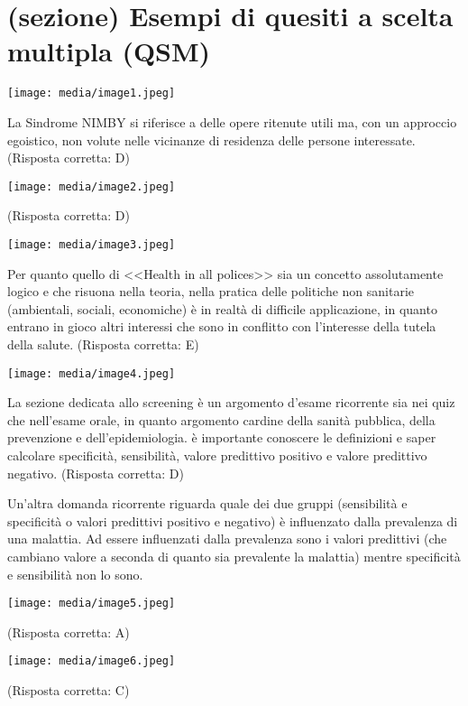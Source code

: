 \documentclass[]{article}
\date{}
\begin{document}
\section{(sezione) Esempi di quesiti a scelta multipla
(QSM)}\label{sezione-esempi-di-quesiti-a-scelta-multipla-qsm}

\texttt{[image: media/image1.jpeg]}

La Sindrome NIMBY si riferisce a delle opere ritenute utili ma, con un
approccio egoistico, non volute nelle vicinanze di residenza delle
persone interessate. (Risposta corretta: D)

\texttt{[image: media/image2.jpeg]}

(Risposta corretta: D)

\texttt{[image: media/image3.jpeg]}

Per quanto quello di \textless{}\textless{}Health in all
polices\textgreater{}\textgreater{} sia un concetto assolutamente logico
e che risuona nella teoria, nella pratica delle politiche non sanitarie
(ambientali, sociali, economiche) è in realtà di difficile applicazione,
in quanto entrano in gioco altri interessi che sono in conflitto con
l'interesse della tutela della salute. (Risposta corretta: E)

\texttt{[image: media/image4.jpeg]}

La sezione dedicata allo screening è un argomento d'esame ricorrente sia
nei quiz che nell'esame orale, in quanto argomento cardine della sanità
pubblica, della prevenzione e dell'epidemiologia. è importante conoscere
le definizioni e saper calcolare specificità, sensibilità, valore
predittivo positivo e valore predittivo negativo. (Risposta corretta: D)

Un'altra domanda ricorrente riguarda quale dei due gruppi (sensibilità e
specificità o valori predittivi positivo e negativo) è influenzato dalla
prevalenza di una malattia. Ad essere influenzati dalla prevalenza sono
i valori predittivi (che cambiano valore a seconda di quanto sia
prevalente la malattia) mentre specificità e sensibilità non lo sono.

\texttt{[image: media/image5.jpeg]}

(Risposta corretta: A)

\texttt{[image: media/image6.jpeg]}

(Risposta corretta: C)
\end{document}

